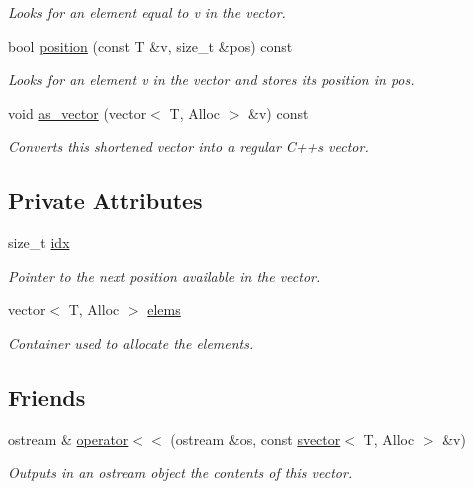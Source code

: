 \begin{DoxyCompactItemize}
\begin{DoxyCompactList}\small\item\em Looks for an element equal to {\itshape v} in the vector. \end{DoxyCompactList}\item 
bool \hyperlink{classlgraph_1_1utils_1_1svector_aed55a2e91d3ba407b5268ba339dddd81}{position} (const T \&v, size\+\_\+t \&pos) const 
\begin{DoxyCompactList}\small\item\em Looks for an element {\itshape v} in the vector and stores its position in {\itshape pos}. \end{DoxyCompactList}\item 
void \hyperlink{classlgraph_1_1utils_1_1svector_a4c616184715432025981cd1f0c67566e}{as\+\_\+vector} (vector$<$ T, Alloc $>$ \&v) const 
\begin{DoxyCompactList}\small\item\em Converts this shortened vector into a regular C++\textquotesingle{}s vector. \end{DoxyCompactList}\end{DoxyCompactItemize}
\subsection*{Private Attributes}
\begin{DoxyCompactItemize}
\item 
size\+\_\+t \hyperlink{classlgraph_1_1utils_1_1svector_a7ef963c079c7dc8a6a559ceef81a241f}{idx}
\begin{DoxyCompactList}\small\item\em Pointer to the next position available in the vector. \end{DoxyCompactList}\item 
vector$<$ T, Alloc $>$ \hyperlink{classlgraph_1_1utils_1_1svector_a2f7e4bc6e7b3c0ea60359f32e0d84be8}{elems}
\begin{DoxyCompactList}\small\item\em Container used to allocate the elements. \end{DoxyCompactList}\end{DoxyCompactItemize}
\subsection*{Friends}
\begin{DoxyCompactItemize}
\item 
ostream \& \hyperlink{classlgraph_1_1utils_1_1svector_aae7bdd317f865bf050de3ddcd0b26303}{operator$<$$<$} (ostream \&os, const \hyperlink{classlgraph_1_1utils_1_1svector}{svector}$<$ T, Alloc $>$ \&v)
\begin{DoxyCompactList}\small\item\em Outputs in an ostream object the contents of this vector. \end{DoxyCompactList}\end{DoxyCompactItemize}


